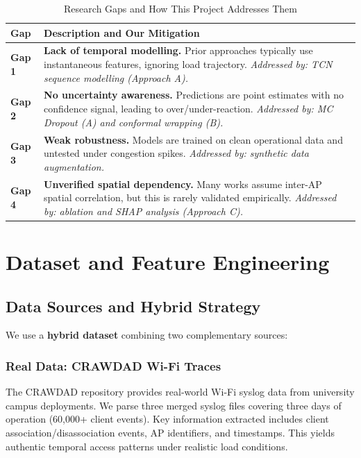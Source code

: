 \documentclass[12pt,a4paper]{article}
\begin{document}
\begin{table}[H]
\centering
\caption{Research Gaps and How This Project Addresses Them}
\label{tab:gaps}
\renewcommand{\arraystretch}{1.35}
\begin{tabular}{>{\bfseries\color{apblue}}l p{9cm}}
\toprule
\textbf{Gap} & \textbf{Description and Our Mitigation} \\
\midrule
Gap 1 & \textbf{Lack of temporal modelling.} Prior approaches typically use instantaneous features, ignoring load trajectory. \textit{Addressed by: TCN sequence modelling (Approach A).} \\[4pt]
Gap 2 & \textbf{No uncertainty awareness.} Predictions are point estimates with no confidence signal, leading to over/under-reaction. \textit{Addressed by: MC Dropout (A) and conformal wrapping (B).} \\[4pt]
Gap 3 & \textbf{Weak robustness.} Models are trained on clean operational data and untested under congestion spikes. \textit{Addressed by: synthetic data augmentation.} \\[4pt]
Gap 4 & \textbf{Unverified spatial dependency.} Many works assume inter-AP spatial correlation, but this is rarely validated empirically. \textit{Addressed by: ablation and SHAP analysis (Approach C).} \\
\bottomrule
\end{tabular}
\end{table}

\section{Dataset and Feature Engineering}
\label{sec:dataset}

\subsection{Data Sources and Hybrid Strategy}

We use a \textbf{hybrid dataset} combining two complementary sources:

\subsubsection{Real Data: CRAWDAD Wi-Fi Traces}
The CRAWDAD repository provides real-world Wi-Fi syslog data from university campus deployments. We parse three merged syslog files covering three days of operation (60,000+ client events). Key information extracted includes client association/disassociation events, AP identifiers, and timestamps. This yields authentic temporal access patterns under realistic load conditions.
\end{document}
